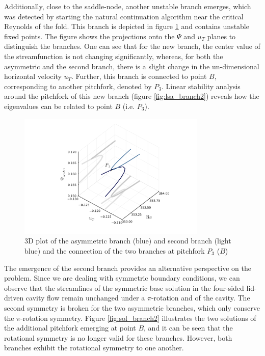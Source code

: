 Additionally, close to the saddle-node, another unstable branch emerges, which
was detected by starting the natural continuation algorithm near the critical
Reynolds of the fold. This branch is depicted in figure \ref{fig:branch2} and
contains unstable fixed points. The figure shows the projections onto the $\Psi$
and $u_T$ planes to distinguish the branches. One can see that for the new
branch, the center value of the streamfunction is not changing significantly,
whereas, for both the asymmetric and the second branch, there is a slight
change in the un-dimensional horizontal velocity $u_T$. Further, this branch is
connected to point $B$, corresponding to another pitchfork, denoted by $P_3$.
Linear stability analysis around the pitchfork of this new branch (figure
\ref{fig:lsa_branch2}) reveals how the eigenvalues can be related to point $B$
(i.e. $P_3$).

\begin{figure}[h!]
  \centering
  \includegraphics[width=0.8\textwidth]{figs/branch2_64x64.pdf}
  \caption{3D plot of the asymmetric branch (blue) and second branch (light blue) and the
    connection of the two branches at pitchfork $P_3$ ($B$)}
  \label{fig:branch2}
\end{figure}

The emergence of the second branch provides an alternative perspective on the
problem. Since we are dealing with symmetric boundary conditions, we can
observe that the streamlines of the symmetric base solution in the four-sided
lid-driven cavity flow remain unchanged under a $\pi$-rotation and  of the cavity. The second symmetry is broken for the
two asymmetric branches, which only conserve the $\pi$-rotation symmetry.
Figure \ref{fig:sol_branch2} illustrates the two solutions of the additional
pitchfork emerging at point $B$, and it can be seen that the rotational
symmetry is no longer valid for these branches. However, both branches exhibit
the rotational symmetry to one another.

